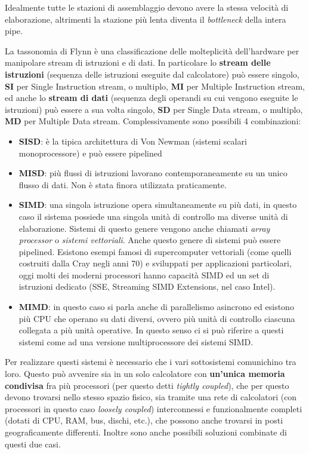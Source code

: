 Idealmente tutte le stazioni di assemblaggio devono avere la stessa
velocità di elaborazione, altrimenti la stazione più lenta diventa il
\emph{bottleneck} della intera pipe.

La tassonomia di Flynn è una classificazione delle molteplicità
dell'hardware per manipolare stream di istruzioni e di dati. In
particolare lo \textbf{stream delle istruzioni} (sequenza delle
istruzioni eseguite dal calcolatore) può essere singolo, \textbf{SI} per
Single Instruction stream, o multiplo, \textbf{MI} per Multiple
Instruction stream, ed anche lo \textbf{stream di dati} (sequenza degli
operandi su cui vengono eseguite le istruzioni) può essere a sua volta
singolo, \textbf{SD} per Single Data stream, o multiplo, \textbf{MD} per
Multiple Data stream. Complessivamente sono possibili 4 combinazioni:

\begin{itemize}
\tightlist
\item
  \textbf{SISD}: è la tipica architettura di Von Newman (sistemi scalari
  monoprocessore) e può essere pipelined
\item
  \textbf{MISD}: più flussi di istruzioni lavorano contemporaneamente su
  un unico flusso di dati. Non è stata finora utilizzata praticamente.
\item
  \textbf{SIMD}: una singola istruzione opera simultaneamente su più
  dati, in questo caso il sistema possiede una singola unità di
  controllo ma diverse unità di elaborazione. Sistemi di questo genere
  vengono anche chiamati \emph{array processor} o \emph{sistemi
  vettoriali}. Anche questo genere di sistemi può essere pipelined.
  Esistono esempi famosi di supercomputer vettoriali (come quelli
  costruiti dalla Cray negli anni 70) e sviluppati per applicazioni
  particolari, oggi molti dei moderni processori hanno capacità SIMD ed
  un set di istruzioni dedicato (SSE, Streaming SIMD Extensions, nel
  caso Intel).
\item
  \textbf{MIMD}: in questo caso si parla anche di parallelismo asincrono
  ed esistono più CPU che operano su dati diversi, ovvero più unità di
  controllo ciascuna collegata a più unità operative. In questo senso ci
  si può riferire a questi sistemi come ad una versione multiprocessore
  dei sistemi SIMD.
\end{itemize}

Per realizzare questi sistemi è necessario che i vari sottosistemi
comunichino tra loro. Questo può avvenire sia in un solo calcolatore con
\textbf{un'unica memoria condivisa} fra più processori (per questo detti
\emph{tightly coupled}), che per questo devono trovarsi nello stesso
spazio fisico, sia tramite una rete di calcolatori (con processori in
questo caso \emph{loosely coupled}) interconnessi e funzionalmente
completi (dotati di CPU, RAM, bus, dischi, etc.), che possono anche
trovarsi in posti geograficamente differenti. Inoltre sono anche
possibili soluzioni combinate di questi due casi.

